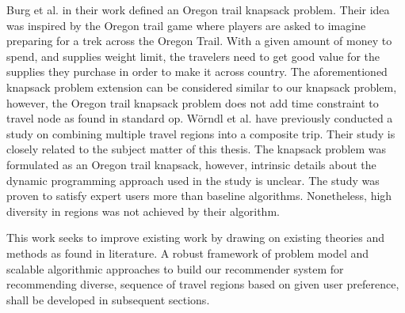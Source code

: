 Burg et al.\parencite{Oregon_Trail_Knapsack} in their work defined an Oregon trail knapsack problem. Their idea was inspired by the Oregon trail game where players are asked to imagine preparing for a trek across the Oregon Trail. With a given amount of money to spend, and supplies weight limit, the travelers need to get good value for the supplies they purchase in order to make it across country. The aforementioned knapsack problem extension can be considered similar to our knapsack problem, however, the Oregon trail knapsack problem does not add time constraint to travel node as found in standard \gls{op}. Wörndl et al.\parencite{cbrecsys2014} have previously conducted a study on combining multiple travel regions into a composite trip. Their study is closely related to the subject matter of this thesis. The knapsack problem was formulated as an Oregon trail knapsack, however, intrinsic details about the dynamic programming approach used in the study is unclear. The study was proven to satisfy expert users more than baseline algorithms. Nonetheless, high diversity in regions was not achieved by their algorithm\parencite{cbrecsys2014}.

This work seeks to improve existing work by drawing on existing theories and methods as found in literature. A robust framework of problem model and scalable algorithmic approaches to build our recommender system for recommending diverse,  sequence of travel regions based on given user preference, shall be developed in subsequent sections.
